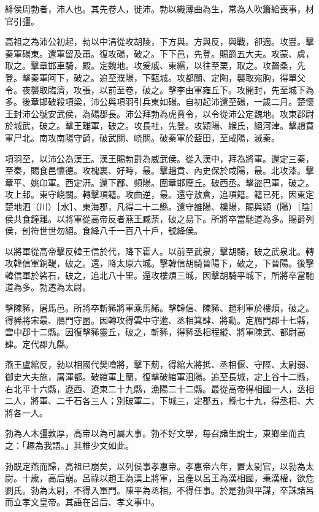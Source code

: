 
\begin{pinyinscope}
絳侯周勃者，沛人也。其先卷人，徙沛。勃以織薄曲為生，常為人吹簫給喪事，材官引彊。

高祖之為沛公初起，勃以中涓從攻胡陵，下方與。方與反，與戰，卻適。攻豐。擊秦軍碭東。還軍留及蕭。復攻碭，破之。下下邑，先登。賜爵五大夫。攻蒙、虞，取之。擊章邯車騎，殿。定魏地。攻爰戚、東緡，以往至栗，取之。攻齧桑，先登。擊秦軍阿下，破之。追至濮陽，下甄城。攻都關、定陶，襲取宛朐，得單父令。夜襲取臨濟，攻張，以前至卷，破之。擊李由軍雍丘下。攻開封，先至城下為多。後章邯破殺項梁，沛公與項羽引兵東如碭。自初起沛還至碭，一歲二月。楚懷王封沛公號安武侯，為碭郡長。沛公拜勃為虎賁令，以令從沛公定魏地。攻東郡尉於城武，破之。擊王離軍，破之。攻長社，先登。攻潁陽、緱氏，絕河津。擊趙賁軍尸北。南攻南陽守齮，破武關、峣關。破秦軍於藍田，至咸陽，滅秦。

項羽至，以沛公為漢王。漢王賜勃爵為威武侯。從入漢中，拜為將軍。還定三秦，至秦，賜食邑懷德。攻槐裏、好畤，最。擊趙賁、內史保於咸陽，最。北攻漆。擊章平、姚卬軍。西定汧。還下郿、頻陽。圍章邯廢丘。破西丞。擊盜巴軍，破之。攻上邽。東守峣關。轉擊項籍。攻曲逆，最。還守敖倉，追項籍。籍已死，因東定楚地泗（川）［水］、東海郡，凡得二十二縣。還守雒陽、櫟陽，賜與潁（陽）［陰］侯共食鐘離。以將軍從高帝反者燕王臧荼，破之易下。所將卒當馳道為多。賜爵列侯，剖符世世勿絕。食絳八千一百八十戶，號絳侯。

以將軍從高帝擊反韓王信於代，降下霍人。以前至武泉，擊胡騎，破之武泉北。轉攻韓信軍銅鞮，破之。還，降太原六城。擊韓信胡騎晉陽下，破之，下晉陽。後擊韓信軍於硰石，破之，追北八十里。還攻樓煩三城，因擊胡騎平城下，所將卒當馳道為多。勃遷為太尉。

擊陳豨，屠馬邑。所將卒斬豨將軍乘馬絺。擊韓信、陳豨、趙利軍於樓煩，破之。得豨將宋最、鴈門守圂。因轉攻得雲中守遬、丞相箕肆、將勳。定鴈門郡十七縣，雲中郡十二縣。因復擊豨靈丘，破之，斬豨，得豨丞相程縱、將軍陳武、都尉高肆。定代郡九縣。

燕王盧綰反，勃以相國代樊噲將，擊下薊，得綰大將抵、丞相偃、守陘、太尉弱、御史大夫施，屠渾都。破綰軍上蘭，復擊破綰軍沮陽。追至長城，定上谷十二縣，右北平十六縣，遼西、遼東二十九縣，漁陽二十二縣。最從高帝得相國一人，丞相二人，將軍、二千石各三人；別破軍二，下城三，定郡五，縣七十九，得丞相、大將各一人。

勃為人木彊敦厚，高帝以為可屬大事。勃不好文學，每召諸生說士，東鄉坐而責之：「趣為我語。」其椎少文如此。

勃既定燕而歸，高祖已崩矣，以列侯事孝惠帝。孝惠帝六年，置太尉官，以勃為太尉。十歲，高后崩。呂祿以趙王為漢上將軍，呂產以呂王為漢相國，秉漢權，欲危劉氏。勃為太尉，不得入軍門。陳平為丞相，不得任事。於是勃與平謀，卒誅諸呂而立孝文皇帝。其語在呂后、孝文事中。


\end{pinyinscope}
